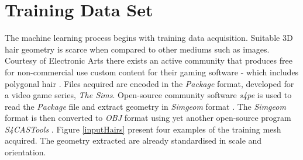 \documentclass[ %
author={Dillon Keith Diep},
supervisor={Dr. Carl Henrik Ek},
degree={MEng},
title={ART-CG Hair:},
subtitle={Assisted Real-time Content Generation of Stylised Virtual Hair},
type={Research},
year={2017} ]{dissertation}
\begin{document}
	\section{Training Data Set}
	The machine learning process begins with training data acquisition. Suitable 3D hair geometry is scarce when compared to other mediums such as images. Courtesy of Electronic Arts there exists an active community that produces free for non-commercial use custom content for their gaming software - which includes polygonal hair \cite{tsr}. Files acquired are encoded in the \textit{Package} format, developed for a video game series, \textit{The Sims}. Open-source community software \textit{s4pe} is used to read the \textit{Package} file and extract geometry in \textit{Simgeom} format \cite{s4pe}. The \textit{Simgeom} format is then converted to \textit{OBJ} format using yet another open-source program \textit{S4CASTools} \cite{s4cas}. Figure \ref{inputHairs} present four examples of the training mesh acquired. The geometry extracted are already standardised in scale and orientation.
	
\end{document}
